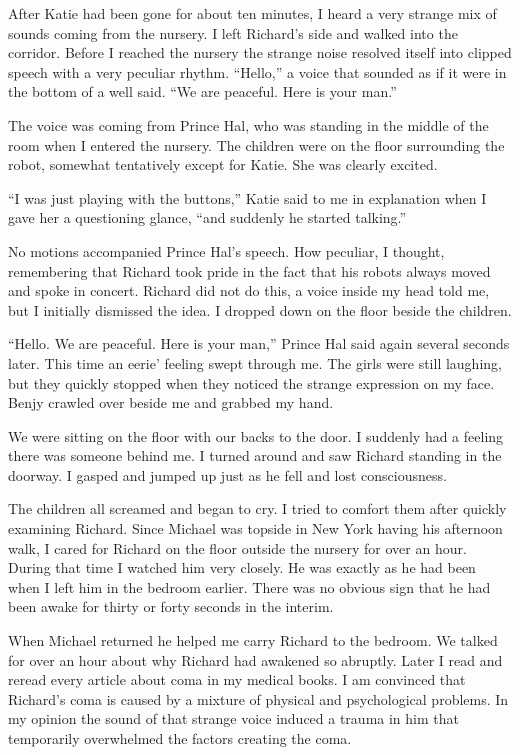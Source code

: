 \documentclass[]{article}
\begin{document}
{After Katie had been gone for about ten minutes, I heard a very strange mix of sounds coming from the nursery.  I left Richard’s side and walked into the corridor.  Before I reached the nursery the strange noise resolved itself into clipped speech with a very peculiar rhythm.  “Hello,” a voice that sounded as if it were in the bottom of a well said.  “We are peaceful.  Here is your man.”

The voice was coming from Prince Hal, who was standing in the middle of the room when I entered the nursery.  The children were on the floor surrounding the robot, somewhat tentatively except for Katie.  She was clearly excited.

“I was just playing with the buttons,” Katie said to me in explanation when I gave her a questioning glance, “and suddenly he started talking.”

No motions accompanied Prince Hal’s speech.  How peculiar, I thought, remembering that Richard took pride in the fact that his robots always moved and spoke in concert.  Richard did not do this, a voice inside my head told me, but I initially dismissed the idea.  I dropped down on the floor beside the children.

“Hello.  We are peaceful.  Here is your man,” Prince Hal said again several seconds later.  This time an eerie’ feeling swept through me.  The girls were still laughing, but they quickly stopped when they noticed the strange expression on my face.  Benjy crawled over beside me and grabbed my hand.

We were sitting on the floor with our backs to the door.  I suddenly had a feeling there was someone behind me.  I turned around and saw Richard standing in the doorway.  I gasped and jumped up just as he fell and lost consciousness.

The children all screamed and began to cry.  I tried to comfort them after quickly examining Richard.  Since Michael was topside in New York having his afternoon walk, I cared for Richard on the floor outside the nursery for over an hour.  During that time I watched him very closely.  He was exactly as he had been when I left him in the bedroom earlier.  There was no obvious sign that he had been awake for thirty or forty seconds in the interim.

When Michael returned he helped me carry Richard to the bedroom.  We talked for over an hour about why Richard had awakened so abruptly.  Later I read and reread every article about coma in my medical books.  I am convinced that Richard’s coma is caused by a mixture of physical and psychological problems.  In my opinion the sound of that strange voice induced a trauma in him that temporarily overwhelmed the factors creating the coma.

}
\end{document}
